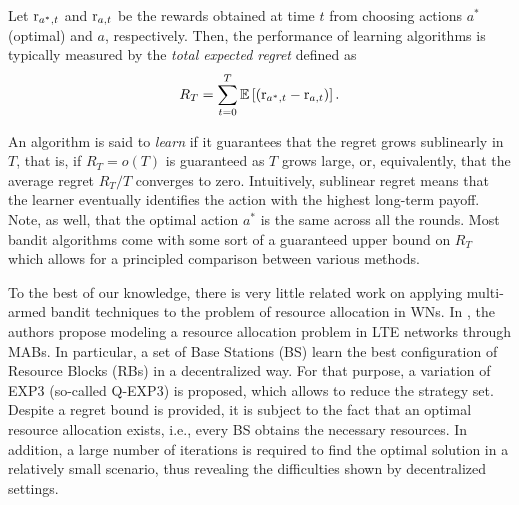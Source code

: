 \documentclass[preprint,12pt]{elsarticle}
\begin{document}
Let ${\rm r}_{a^*,t}$ and ${\rm r}_{a,t}$ be the rewards obtained at time $t$ from choosing actions $a^*$ (optimal) and $a$, respectively. Then, the performance of learning algorithms is typically measured by the \emph{total expected regret} defined as  \[R_T = \sum_{t=0}^{T} \mathbb{E}\left[\left({\rm r}_{a^*,t} - {\rm r}_{a,t}\right)\right].\]

An algorithm is said to \emph{learn} if it guarantees that the regret grows sublinearly in $T$, that is, if $R_T = o(T)$ is guaranteed as $T$ grows large, or, equivalently, that the average regret $R_T/T$ converges to zero. Intuitively, sublinear regret means that the learner eventually identifies the action with the highest long-term payoff. Note, as well, that the optimal action $a^*$ is the same across all the rounds. Most bandit algorithms come with some sort of a guaranteed upper bound on $R_T$ which allows for a principled comparison between various methods. 

To the best of our knowledge, there is very little related work on applying multi-armed bandit techniques to the problem of resource allocation in WNs. In \cite{coucheney2015multi}, the authors propose modeling a resource allocation problem in LTE networks through MABs. In particular, a set of Base Stations (BS) learn the best configuration of Resource Blocks (RBs) in a decentralized way. For that purpose, a variation of EXP3 (so-called Q-EXP3) is proposed, which allows to reduce the strategy set. Despite a regret bound is provided, it is subject to the fact that an optimal resource allocation exists, i.e., every BS obtains the necessary resources. In addition, a large number of iterations is required to find the optimal solution in a relatively small scenario, thus revealing the difficulties shown by decentralized settings.
\end{document}

